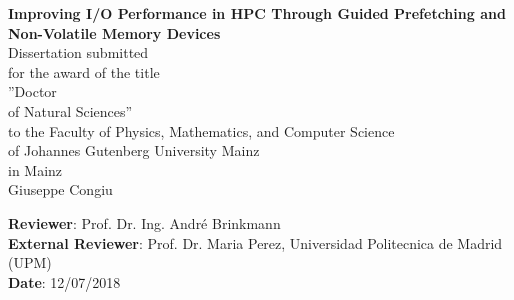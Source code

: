\documentclass[a4paper,titlepage,oneside,11pt]{book}
\author{Giuseppe Congiu}
\begin{document}
\hypersetup{citecolor=black,filecolor=black,linkcolor=black,urlcolor=blue} %

\begin{titlepage}
\thispagestyle{empty}



\begin{center}
	\vspace{2cm}
    \Large \textbf{Improving I/O Performance in HPC Through Guided Prefetching and Non-Volatile Memory Devices} \\
	\vspace{4cm}
    \normalsize
    Dissertation submitted \\
    for the award of the title \\
    ''Doctor \\
    of Natural Sciences'' \\
    to the Faculty of Physics, Mathematics, and Computer Science \\
    of Johannes Gutenberg University Mainz \\
    in Mainz \\
    \vspace{0.5cm}
    Giuseppe Congiu \\
\end{center}
\vspace{1.7cm}

\newpage
\thispagestyle{empty}
\flushleft
    \textbf{Reviewer}: Prof. Dr. Ing. Andr\'e Brinkmann\\
    \textbf{External Reviewer}: Prof. Dr. Maria Perez, Universidad Politecnica de Madrid (UPM)\\
    \textbf{Date}: 12/07/2018




\end{titlepage}
\end{document}
